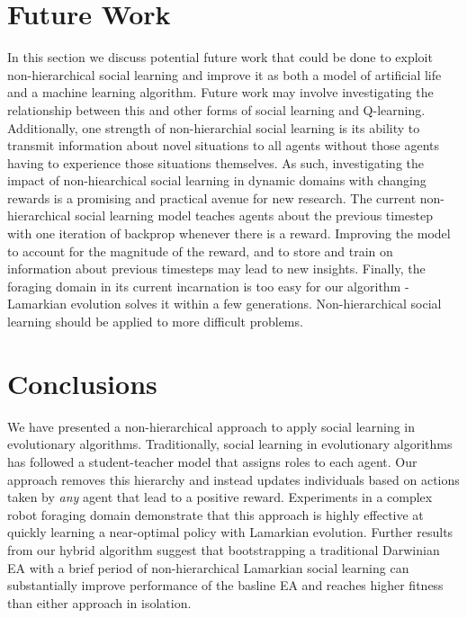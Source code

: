 \documentclass{acm_proc_article-sp}
\begin{document}
\section{Future Work}
\label{sec:future}

In this section we discuss potential future work that could be done to exploit non-hierarchical social learning and improve it as both a model of artificial life and a machine learning algorithm. Future work may involve investigating the relationship between this and other forms of social learning and Q-learning.  Additionally, one strength of non-hierarchial social learning is its ability to transmit information about novel situations to all agents without those agents having to experience those situations themselves.  As such, investigating the impact of non-hiearchical social learning in dynamic domains with changing rewards is a promising and practical avenue for new research.  The current non-hierarchical social learning model teaches agents about the previous timestep with one iteration of backprop whenever there is a reward.  Improving the model to account for the magnitude of the reward, and to store and train on information about previous timesteps may lead to new insights.  Finally, the foraging domain in its current incarnation is too easy for our algorithm - Lamarkian evolution solves it within a few generations. Non-hierarchical social learning should be applied to more difficult problems.


\section{Conclusions}
\label{sec:conclusions}
We have presented a non-hierarchical approach to apply social learning in evolutionary algorithms. Traditionally, social learning in evolutionary algorithms has followed a student-teacher model that assigns roles to each agent. Our approach removes this hierarchy and instead updates individuals based on actions taken by \textit{any} agent that lead to a positive reward. Experiments in a complex robot foraging domain demonstrate that this approach is highly effective at quickly learning a near-optimal policy with Lamarkian evolution. Further results from our hybrid algorithm suggest that bootstrapping a traditional Darwinian EA with a brief period of non-hierarchical Lamarkian social learning can substantially improve performance of the basline EA and reaches higher fitness than either approach in isolation.
\end{document}
